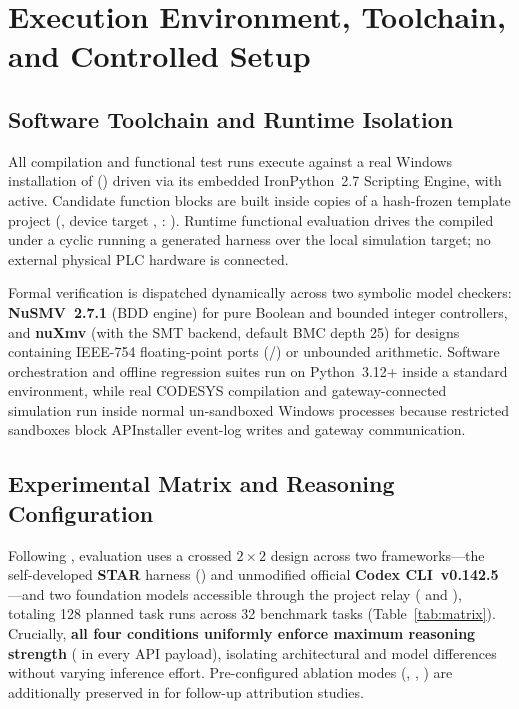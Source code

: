 
\section{Execution Environment, Toolchain, and Controlled Setup}

\subsection{Software Toolchain and Runtime Isolation}
All compilation and functional test runs execute against a real Windows installation of  () driven via its embedded IronPython~2.7 Scripting Engine, with  active. Candidate function blocks are built inside copies of a hash-frozen template project (, device target , : \texttt{\small{}}). Runtime functional evaluation drives the compiled  under a  cyclic  running a generated  harness over the local simulation target; no external physical PLC hardware is connected.

Formal verification is dispatched dynamically across two symbolic model checkers: \textbf{NuSMV~2.7.1} (BDD engine) for pure Boolean and bounded integer controllers, and \textbf{nuXmv} (with the  SMT backend, default BMC depth 25) for designs containing IEEE-754 floating-point ports (/) or unbounded arithmetic. Software orchestration and offline regression suites run on Python~3.12+ inside a standard environment, while real CODESYS compilation and gateway-connected simulation run inside normal un-sandboxed Windows processes because restricted sandboxes block APInstaller event-log writes and gateway communication.

\subsection{Experimental Matrix and Reasoning Configuration}
Following , evaluation uses a crossed $2 \times 2$ design across two frameworks---the self-developed \textbf{STAR} harness () and unmodified official \textbf{Codex CLI~v0.142.5}---and two foundation models accessible through the project relay ( and ), totaling 128 planned task runs across 32 benchmark tasks (Table~\ref{tab:matrix}). Crucially, \textbf{all four conditions uniformly enforce maximum reasoning strength} ( in every API payload), isolating architectural and model differences without varying inference effort. Pre-configured ablation modes (, , ) are additionally preserved in  for follow-up attribution studies.


